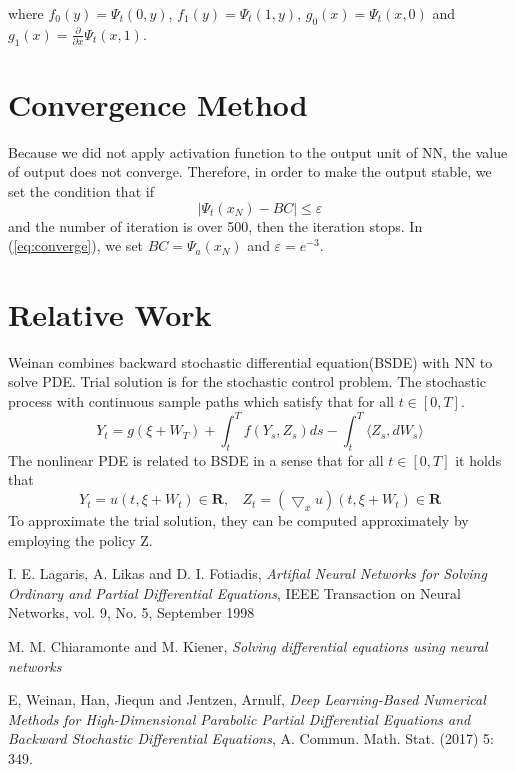 \documentclass{article}
\begin{document}
\medskip \noindent
where $f_{0}(y)=\Psi_t(0,y)$, $f_{1}(y)=\Psi_t(1,y)$, $g_{0}(x)=\Psi_t(x,0)$ and $g_{1}(x)=\frac{\partial}{\partial x}\Psi_t(x,1)$.


\section{Convergence Method}

Because we did not apply activation function to the output unit of NN, the value of output does not converge. Therefore, in order to make the output stable, we set the condition that if 
\begin{equation}\label{eq:converge}
| \Psi_t(x_N) - BC| \leq \varepsilon
\end{equation}
\medspace \noindent
and the number of iteration is over 500, then the iteration stops. In (\ref{eq:converge}), we set $BC=\Psi_{a}(x_N)$ and $\varepsilon=e^{-3}$.







\section{Relative Work}

Weinan\cite{weinan} combines backward stochastic differential equation(BSDE) with NN to solve PDE.
Trial solution is for the stochastic control problem.
The stochastic process with continuous sample paths which satisfy that for all $t \in [0,T]$.
\begin{equation}
Y_t = g(\xi + W_T) + \int_{t}^{T}f(Y_s,Z_s)ds - \int_{t}^{T}\langle  Z_s,dW_s \rangle
\end{equation}
The nonlinear PDE is related to BSDE in a sense that for all $t \in [0,T]$ it holds that 
\begin{equation}
Y_t = u(t,\xi + W_t) \in \mathbf{R}, \ \ \ \ Z_t=(\bigtriangledown_{x}u)(t,\xi + W_t) \in \mathbf{R}
\end{equation}
To approximate the trial solution, they can be computed approximately by employing the policy Z.


%
%
\begin{thebibliography}{9}
I. E. Lagaris, A. Likas and D. I. Fotiadis,
\textit{Artifial Neural Networks for Solving Ordinary and Partial Differential Equations},
IEEE Transaction on Neural Networks, vol. 9, No. 5, September 1998

M. M. Chiaramonte and M. Kiener,
\textit{Solving differential equations using neural networks}

E, Weinan, Han, Jiequn and Jentzen, Arnulf,
\textit{Deep Learning-Based Numerical Methods for High-Dimensional Parabolic Partial Differential Equations and Backward Stochastic Differential Equations},
A. Commun. Math. Stat. (2017) 5: 349.
\end{thebibliography}
\end{document}
